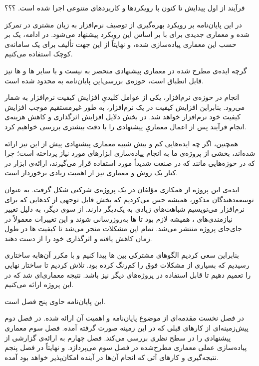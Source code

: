 	
فرآیند  از اول پیدایش تا کنون با رویکرد‌ها و کاربردهای
متنوعی اجرا شده است. ؟؟؟

در این پایان‌نامه بر رویکرد بهره‌گیری از توصیف
نرم‌افزار به زبان مشتری در  تمرکز شده و معماری‌ جدیدی برای
 با   بر اساس این رویکرد پیشنهاد می‌شود.
در ادامه، یک   بر
حسب این معماری پیاده‌سازی شده، و نهایتاً از این  جهت تألیف
 برای یک سامانه‌ی کوچک استفاده می‌کنیم.

گرچه ایده‌ی مطرح شده در معماری پیشنهادی منحصر به 
 نیست و با سایر ‌ها و ‌ها نیز
قابل انطباق است، حوزه‌ی بررسی‌این پایان‌نامه به 
 محدود شده است.

انجام  در حوزه‌ی نرم‌افزار، یکی از عوامل کلیدیِ افزایش کیفیت نرم‌افزار به شمار می‌رود. بنابراین افزایش کیفیت  در یک نرم‌افزار، به طور غیرمستقیم موجب افزایش کیفیت خود نرم‌افزار خواهد شد. در بخش  دلایل افزایش اثرگذاری و کاهش هزینه‌ی انجام فرآیند  پس از اعمال معماریِ پیشنهادی را با دقت بیشتری بررسی خواهیم کرد.

همچنین، اگر چه ایده‌هایی کم و بیش شبیه معماری پیشنهادی پیش از این نیز ارائه شده‌اند، بخشی از پروژه‌ی ما به انجام پیاده‌سازی ابزارهای مورد نیاز پرداخته است؛ چرا که در حوزه‌هایی مانند  که در صنعت شدیداً مورد استفاده قرار می‌گیرند، ارائه‌ی ابزار در کنار یک روش و معماری نیز از اهمیت زیادی برخوردار است.



ایده‌ی این پروژه از همکاری مؤلفان در یک پروژه‌ی شرکتی شکل گرفت. به عنوان توسعه‌دهندگان  مذکور، همیشه حس می‌کردیم که بخش قابل توجهی از کدهایی که برای  نرم‌افزار می‌نویسیم شباهت‌های زیادی به یک‌دیگر دارند.
از سوی دیگر، به دلیل تغییر نیازمندی‌های ، همیشه لازم بود تا ‌ها به‌روزرسانی شوند و این تغییرات معمولاً در جای‌جای پروژه منتشر می‌شد. تمام این مشکلات منجر می‌شد تا کیفیت ‌ها در طول زمان کاهش یافته و اثرگذاری خود را از دست دهند.

بنابراین سعی کردیم الگوهای مشترکی بین ‌ها پیدا کنیم و با  مکرر آن‌هابه ساختاری رسیدیم که بسیاری از مشکلات فوق را کم‌رنگ کرده بود. تلاش کردیم تا ساختار نهایی را تعمیم دهیم تا قابل استفاده در پروژه‌های دیگر نیز باشد. نتیجه معماری‌ای شد که در این پروژه ارائه می‌کنیم.


این پایان‌نامه حاوی پنج فصل است.

در فصل نخست مقدمه‌ای از موضوع پایان‌نامه و اهمیت آن ارائه شده. در فصل دوم پیش‌زمینه‌ای از کارهای قبلی که در این زمینه صورت گرفته آمده. فصل سوم معماری پیشنهادی را در سطح نظری بررسی می‌کند. فصل چهارم به ارائه‌ی گزارشی از پیاده‌سازی عملی معماری مطرح‌شده در فصل سوم می‌پردازد. و نهایتاً در فصل پنجم نتیجه‌گیری و کارهای آتی که انجام آن‌ها در آینده امکان‌پذیر خواهد بود آمده.

